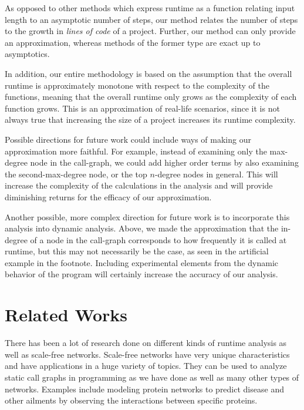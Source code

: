 \documentclass[11pt,a4paper,twocolumn]{article}
\begin{document}
\begin{singlespace}
As opposed to other methods which express runtime as a function relating input
length to an asymptotic number of steps, our method relates the number of steps
to the growth in \emph{lines of code} of a project. Further, our method can
only provide an approximation, whereas methods of the former type are exact
up to asymptotics.

In addition, our entire methodology is based on the assumption that the overall
runtime is approximately monotone with respect to the complexity of the
functions, meaning that the overall runtime only grows as the complexity of
each function grows. This is an approximation of real-life scenarios, since
it is not always true that increasing the size of a project increases its
runtime complexity.

Possible directions for future work could include ways of making our
approximation more faithful. For example, instead of examining only the
max-degree node in the call-graph, we could add higher order terms by also
examining the second-max-degree node, or the top $n$-degree nodes in general.
This will increase the complexity of the calculations in the analysis and
will provide diminishing returns for the efficacy of our approximation.

Another possible, more complex direction for future work is to incorporate
this analysis into dynamic analysis. Above, we made the approximation that
the in-degree of a node in the call-graph corresponds to how frequently it is
called at runtime, but this may not necessarily be the case, as seen in the
artificial example in the footnote. Including experimental elements from
the dynamic behavior of the program will certainly increase the accuracy of
our analysis.

\section{Related Works}

There has been a lot of research done on different kinds of runtime analysis as
well as scale-free networks. Scale-free networks have very unique characteristics
and have applications in a huge variety of topics. They can be used to analyze
static call graphs in programming as we have done as well as many other types
of networks. Examples include modeling protein networks to predict disease and
other ailments by observing the interactions between specific proteins.



\end{singlespace}
\end{document}
